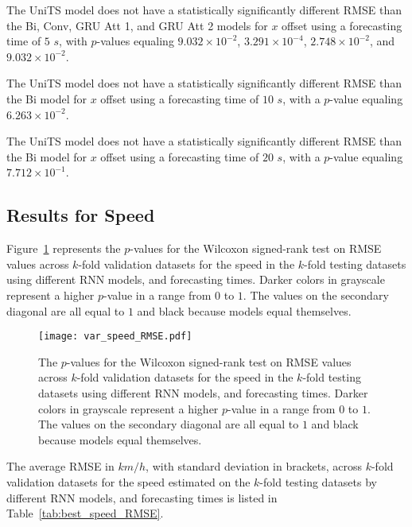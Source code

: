 The UniTS model does not have a statistically significantly different RMSE than the Bi, Conv, GRU Att 1, and GRU Att 2 models for $x$ offset using a forecasting time of $5$ $s$, with $p$-values equaling $9.032 \times 10^{-2}$, $3.291 \times 10^{-4}$, $2.748 \times 10^{-2}$, and $9.032 \times 10^{-2}$.

The UniTS model does not have a statistically significantly different RMSE than the Bi model for $x$ offset using a forecasting time of $10$ $s$, with a $p$-value equaling $6.263 \times 10^{-2}$.

The UniTS model does not have a statistically significantly different RMSE than the Bi model for $x$ offset using a forecasting time of $20$ $s$, with a $p$-value equaling $7.712 \times 10^{-1}$.

\subsection{Results for Speed}

Figure~\ref{fig:var_speed_RMSE} represents the $p$-values for the Wilcoxon signed-rank test on RMSE values across $k$-fold validation datasets for the speed in the $k$-fold testing datasets using different RNN models, and forecasting times. Darker colors in grayscale represent a higher $p$-value in a range from $0$ to $1$. The values on the secondary diagonal are all equal to $1$ and black because models equal themselves.

\begin{figure}[!ht]
	\centering
	\texttt{[image: var\_speed\_RMSE.pdf]}
	\caption{The $p$-values for the Wilcoxon signed-rank test on RMSE values across $k$-fold validation datasets for the speed in the $k$-fold testing datasets using different RNN models, and forecasting times. Darker colors in grayscale represent a higher $p$-value in a range from $0$ to $1$. The values on the secondary diagonal are all equal to $1$ and black because models equal themselves.}
	\label{fig:var_speed_RMSE}
\end{figure}

The average RMSE in $km/h$, with standard deviation in brackets, across $k$-fold validation datasets for the speed estimated on the $k$-fold testing datasets by different RNN models, and forecasting times is listed in Table~\ref{tab:best_speed_RMSE}.

